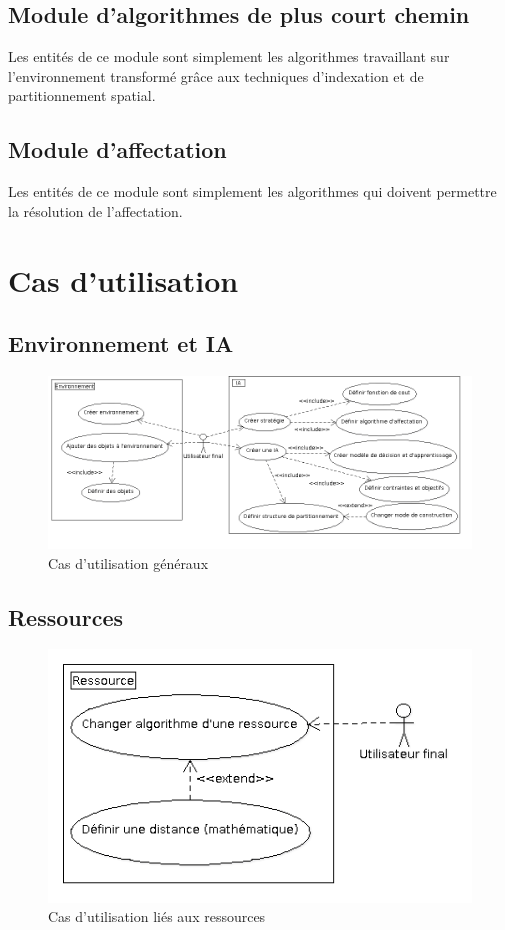 %
\subsection{Module d'algorithmes de plus court chemin}

Les entités de ce module sont simplement les algorithmes travaillant sur l'environnement transformé grâce aux techniques d'indexation et de partitionnement spatial.

%
\subsection{Module d'affectation}

Les entités de ce module sont simplement les algorithmes qui doivent permettre la résolution de l'affectation. 


%
\section{Cas d'utilisation}

\subsection{Environnement et IA}
\begin{figure}[!h]\centering
   \includegraphics[scale=0.5]{images/uc_main.png}
   \caption{\label{uc_main} Cas d'utilisation généraux}
\end{figure}
\subsection{Ressources}
\begin{figure}[!h]\centering
   \includegraphics[scale=0.5]{images/uc_ressource.png}
   \caption{\label{uc_main} Cas d'utilisation liés aux ressources}
\end{figure}
